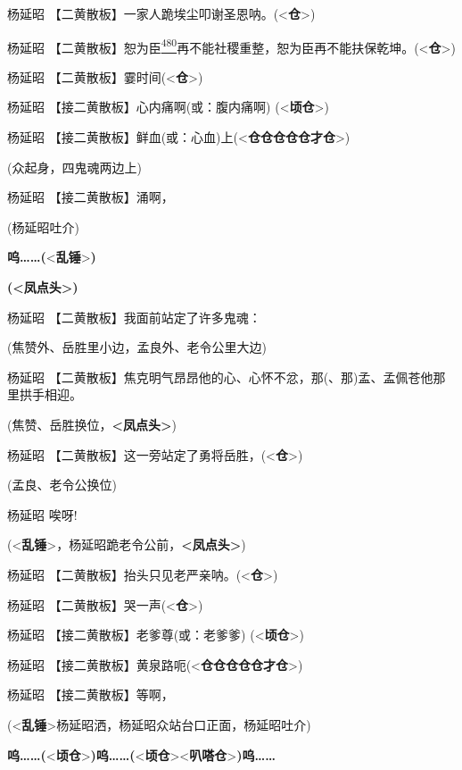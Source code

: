 杨延昭
【二黄散板】一家人跪埃尘叩谢圣恩呐。(\textless{}\textbf{仓}\textgreater{})

杨延昭
【二黄散板】恕为臣\protect\hyperlink{fn480}{\textsuperscript{480}}再不能社稷重整，恕为臣再不能扶保乾坤。(\textless{}\textbf{仓}\textgreater{})

杨延昭 【二黄散板】霎时间(\textless{}\textbf{仓}\textgreater{})

杨延昭 【接二黄散板】心内痛啊(或：腹内痛啊)
(\textless{}\textbf{顷仓}\textgreater{})

杨延昭
【接二黄散板】鲜血(或：心血)上(\textless{}\textbf{仓仓仓仓仓才仓}\textgreater{})

(众起身，四鬼魂两边上)

杨延昭 【接二黄散板】涌啊，

(杨延昭吐介)

\textbf{呜\ldots{}\ldots{}(}\textless{}\textbf{乱锤}\textgreater{}\textbf{)}

\textbf{(\textless{}凤点头\textgreater{})}

杨延昭 【二黄散板】我面前站定了许多鬼魂：

(焦赞外、岳胜里小边，孟良外、老令公里大边)

杨延昭
【二黄散板】焦克明气昂昂他的心、心怀不忿，那(、那)孟、孟佩苍他那里拱手相迎。

(焦赞、岳胜换位，\textbf{\textless{}凤点头\textgreater{}})

杨延昭
【二黄散板】这一旁站定了勇将岳胜，(\textless{}\textbf{仓}\textgreater{})

(孟良、老令公换位)

杨延昭 唉呀!

(\textless{}\textbf{乱锤}\textgreater{}，杨延昭跪老令公前，\textbf{\textless{}凤点头\textgreater{}})

杨延昭
【二黄散板】抬头只见老严亲呐。(\textless{}\textbf{仓}\textgreater{})

杨延昭 【二黄散板】哭一声(\textless{}\textbf{仓}\textgreater{})

杨延昭 【接二黄散板】老爹尊(或：老爹爹)
(\textless{}\textbf{顷仓}\textgreater{})

杨延昭
【接二黄散板】黄泉路呃(\textless{}\textbf{仓仓仓仓仓才仓}\textgreater{})

杨延昭 【接二黄散板】等啊，

(\textless{}\textbf{乱锤}\textgreater{}杨延昭洒，杨延昭众站台口正面，杨延昭吐介)

\textbf{呜\ldots{}\ldots{}(}\textless{}\textbf{顷仓}\textgreater{}\textbf{)呜\ldots{}\ldots{}(}\textless{}\textbf{顷仓}\textgreater{}\textless{}\textbf{叭嗒仓}\textgreater{}\textbf{)呜\ldots{}\ldots{}}

